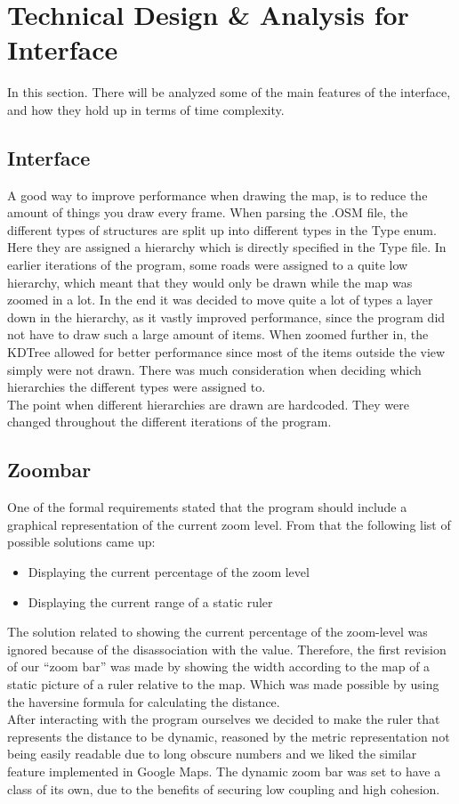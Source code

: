 \section{Technical Design \& Analysis for Interface}

In this section. There will be analyzed some of the main features of the interface, and how they hold up in terms of time complexity.

\subsection{Interface}
A good way to improve performance when drawing the map, is to reduce the amount of things you draw every frame. When parsing the .OSM file, the different types of structures are split up into different types in the Type enum. Here they are assigned a hierarchy which is directly specified in the Type file. In earlier iterations of the program, some roads were assigned to a quite low hierarchy, which meant that they would only be drawn while the map was zoomed in a lot.\newline
In the end it was decided to move quite a lot of types a layer down in the hierarchy, as it vastly improved performance, since the program did not have to draw such a large amount of items. When zoomed further in, the KDTree allowed for better performance since most of the items outside the view simply were not drawn. 
There was much consideration when deciding which hierarchies the different types were assigned to. \\
The point when different hierarchies are drawn are hardcoded. They were changed throughout the different iterations of the program. 

\subsection{Zoombar}
One of the formal requirements stated that the program should include a graphical representation of the current zoom level. From that the following list of possible solutions came up:
\begin{itemize}
    \setlength{\itemsep}{0.2em}
    \item Displaying the current percentage of the zoom level
    \item Displaying the current range of a static ruler
\end{itemize}
The solution related to showing the current percentage of the zoom-level was ignored because of the disassociation with the value. Therefore, the first revision of our “zoom bar” was made by showing the width according to the map of a static picture of a ruler relative to the map. Which was made possible by using the haversine formula for calculating the distance.\\
After interacting with the program ourselves we decided to make the ruler that represents the distance to be dynamic, reasoned by the metric representation not being easily readable due to long obscure numbers and we liked the similar feature implemented in Google Maps. 
The dynamic zoom bar was set to have a class of its own, due to the benefits of securing low coupling and high cohesion.\\

